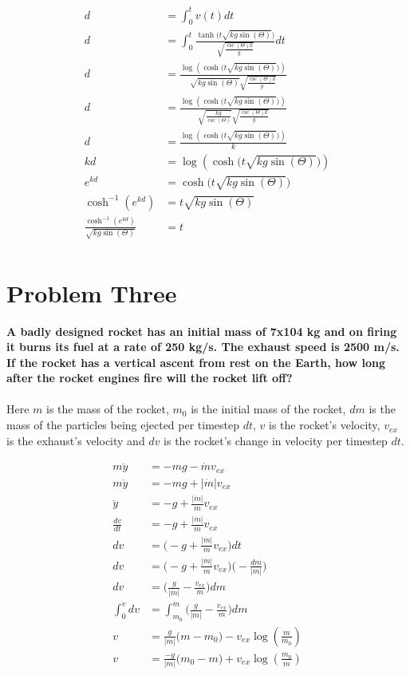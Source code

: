 \documentclass[10pt]{article} %
\begin{document}
\begin{align*}
  d &= \int_0^t v(t) dt\\
  d &= \int_0^t \frac{\tanh\Big(t\sqrt{kg\sin(\Theta)}\Big)}{\sqrt{\frac{\csc(\Theta)k}{g}}} dt\\
  d &= \frac{\log(\cosh\Big(t\sqrt{kg\sin(\Theta)}\Big))}{\sqrt{kg\sin(\Theta)}\sqrt{\frac{\csc(\Theta)k}{g}}}\\
  d &= \frac{\log(\cosh\Big(t\sqrt{kg\sin(\Theta)}\Big))}{\sqrt{\frac{kg}{\csc(\Theta)}}\sqrt{\frac{\csc(\Theta)k}{g}}}\\
 d &= \frac{\log(\cosh\Big(t\sqrt{kg\sin(\Theta)}\Big))}{k}\\    
  kd &= \log(\cosh\Big(t\sqrt{kg\sin(\Theta)}\Big))\\
  e^{kd} &= \cosh\Big(t\sqrt{kg\sin(\Theta)}\Big)\\
  \cosh^{-1}(e^{kd}) &= t\sqrt{kg\sin(\Theta)}\\
  \frac{\cosh^{-1}(e^{kd})}{\sqrt{kg\sin(\Theta)}} &= t\\        
\end{align*}



\vspace{1 cm}

\section{Problem Three}
\textbf{A badly designed rocket has an initial mass of 7x104 kg and on firing it burns its fuel at a rate of 250 kg/s. The exhaust speed is 2500 m/s. If the rocket has a vertical ascent from rest on the Earth, how long after the rocket engines fire will the rocket lift off?} \\ \\
Here $m$ is the mass of the rocket, $m_0$ is the initial mass of the rocket, $dm$ is the mass of the particles being ejected per timestep $dt$, $v$ is the rocket's velocity, $v_{ex}$ is the exhaust's velocity and $dv$ is the rocket's change in velocity per timestep $dt$.

\begin{align*}
  m\ddot{y} &= -mg - \dot{m}v_{ex}\\
  m\ddot{y} &= -mg + |\dot{m}|v_{ex}\\
  \ddot{y} &= -g + \frac{|\dot{m}|}{m}v_{ex}\\
  \frac{dv}{dt} &= -g + \frac{|\dot{m}|}{m}v_{ex}\\
  dv &= \Big(-g + \frac{|\dot{m}|}{m}v_{ex}\Big)dt\\
  dv &= \Big(-g + \frac{|\dot{m}|}{m}v_{ex}\Big)\Big(-\frac{dm}{|\dot{m}|}\Big)\\
  dv &= \Big(\frac{g}{|\dot{m}|} - \frac{v_{ex}}{m}\Big)dm\\
  \int_0^v dv &= \int_{m_0}^m \Big(\frac{g}{|\dot{m}|} - \frac{v_{ex}}{m}\Big)dm\\
  v &= \frac{g}{|\dot{m}|}\big(m-m_0) - v_{ex}\log(\frac{m}{m_0})\\
  v &= \frac{-g}{|\dot{m}|}\big(m_0-m) + v_{ex}\log(\frac{m_0}{m})\\  
\end{align*}
\end{document}
